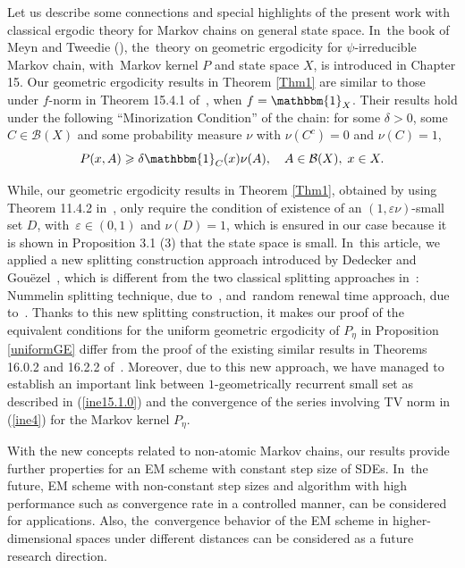 \documentclass[11pt]{elsarticle}
\def\geq{\geqslant}
\begin{document}
Let us describe some connections and special highlights of the present work with classical ergodic theory for Markov chains on general state space. In~the book of Meyn and Tweedie (\cite{MT09}), the~theory on geometric ergodicity for $\psi$-irreducible Markov chain, with~Markov kernel $P$ and state space $X$, is introduced in Chapter 15. Our geometric ergodicity results in Theorem \ref{Thm1} are similar to those under $f$-norm in Theorem 15.4.1 of~\cite{MT09}, when $f=\mathbbm{1}_{X}$. Their results hold under the following ``Minorization Condition'' of the chain: for some $\delta>0$, some $C\in\mathcal{B}(X)$ and some probability measure $\nu$ with $\nu(C^c)=0$ and $\nu(C)=1$,  
\begin{equation*}
	P(x,A)\geq\delta\mathbbm{1}_C(x)\nu(A),\quad A\in\mathcal{B}(X),\; x\in X.
\end{equation*}

While, our geometric ergodicity results in Theorem \ref{Thm1}, obtained by using {Theorem 11.4.2} in~\cite{DMPS18}, only require the condition of existence of an $(1,\varepsilon\nu)$-small set $D$, with~$\varepsilon\in (0,1)$ and $\nu(D)=1$, which is ensured in our case because it is shown in Proposition 3.1 (3) that the state space is small. In~this article, we applied a new splitting construction approach introduced by Dedecker and Gou\"{e}zel~\cite{DG15}, which is different from the two classical splitting approaches in~\cite{MT09}: Nummelin splitting technique, due to~\cite{N84}, and~random renewal time approach, due to~\cite{AN78}. Thanks to this new splitting construction, it makes our proof of the equivalent conditions for the uniform geometric ergodicity of $P_\eta$ in Proposition \ref{uniformGE} differ from the proof of the existing similar results in {Theorems 16.0.2 and 16.2.2} of~\cite{MT09}. Moreover, due to this new approach, we have managed to establish an important link between $1$-geometrically recurrent small set as described in (\ref{ine15.1.0}) and the convergence of the series involving TV norm in (\ref{ine4}) for the Markov kernel $P_\eta$.

With the new concepts related to non-atomic Markov chains, our results provide further properties for an EM scheme with constant step size of SDEs. In~the future, EM scheme with non-constant step sizes and algorithm with high performance such as convergence rate in a controlled manner, can be considered for applications. Also, the~convergence behavior of the EM scheme in higher-dimensional spaces under different distances can be considered as a future research direction. 
\appendix
\end{document}
